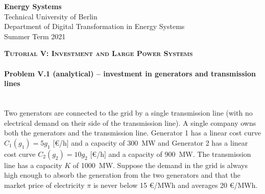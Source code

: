\documentclass[11pt,a4paper,fleqn]{scrartcl}
\begin{document}
\begin{flushright}
	\textbf{Energy Systems}\\
	{\small Technical University of Berlin}\\
	{\small Department of Digital Transformation in Energy Systems}\\
	{\small Summer Term 2021}\\
\end{flushright}

 
 \vspace{-0.5em}
 \hrulefill
 \vspace{0.3em}

\begin{center}
 \textbf{\textsc{\Large Tutorial V: Investment and Large Power Systems}}\\[2.5em]
\end{center}

\vspace{-0.5em}
\hrulefill
\vspace{0.8em}

\vspace{1em}

\paragraph{Problem V.1 (analytical) -- investment in generators and transmission lines \faGroup}~\\

Two generators are connected to the grid by a single transmission
line (with no electrical demand on their side of the transmission line). A single company owns both the generators and the transmission line. Generator 1 has a linear cost curve $C_1(g_1) = 5 g_1$ [\euro/h] and a capacity of 300~MW and Generator 2 has a linear cost curve $C_2(g_2) = 10 g_2$ [\euro/h] and a capacity of 900~MW. The transmission line has a capacity $K$ of 1000~MW. Suppose the demand in the grid is always high enough to absorb the
generation from the two generators and that the market price of
electricity $\pi$ is never below 15 \euro/MWh and averages 20
\euro/MWh.
\end{document}
